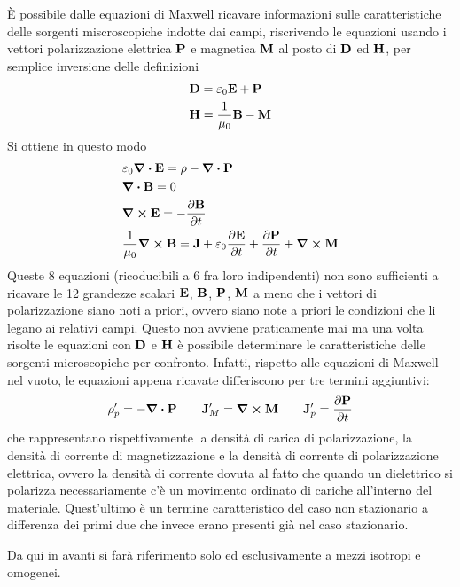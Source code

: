 È possibile dalle equazioni di Maxwell ricavare informazioni sulle caratteristiche delle sorgenti miscroscopiche
indotte dai campi, riscrivendo le equazioni usando i vettori polarizzazione elettrica $\vb{P}$ e magnetica $\vb{M}$
al posto di $\vb{D}$ ed $\vb{H}$, per semplice inversione delle definizioni
\[
    \begin{split}
        & \vb{D}=\varepsilon_0 \vb{E} + \vb{P} \\
        & \vb{H}=\frac{1}{\mu_0}\vb{B} - \vb{M} \\
    \end{split}
\]
Si ottiene in questo modo
\[
    \begin{split}
        & \varepsilon_0\div{\vb{E}}=\rho-\div{\vb{P}}\\
        & \div{\vb{B}}=0 \\
        & \curl{\vb{E}}=-\pdv{\vb{B}}{t}\\
        & \frac{1}{\mu_0}\curl{\vb{B}}=\vb{J}+\varepsilon_0\pdv{\vb{E}}{t}+\pdv{\vb{P}}{t}+\curl{\vb{M}}
    \end{split}
\]
Queste 8 equazioni (ricoducibili a 6 fra loro indipendenti) non sono sufficienti a ricavare le
12 grandezze scalari $\vb{E}$, $\vb{B}$, $\vb{P}$, $\vb{M}$ a meno che i vettori di polarizzazione
siano noti a priori, ovvero siano note a priori le condizioni che li legano ai relativi
campi. Questo non avviene praticamente mai ma una volta risolte le equazioni con $\vb{D}$ e $\vb{H}$ è possibile
determinare le caratteristiche delle sorgenti microscopiche per confronto.
Infatti, rispetto alle equazioni di Maxwell nel vuoto, le equazioni appena ricavate differiscono per tre termini aggiuntivi:
\[
    \rho'_p=-\div{\vb{P}} \quad\quad \vb{J}'_M=\curl{\vb{M}} \quad\quad \vb{J}'_p=\pdv{\vb{P}}{t}
\]
che rappresentano rispettivamente la densità di carica di polarizzazione, la densità di corrente di
magnetizzazione e la densità di corrente di polarizzazione elettrica, ovvero la densità di corrente dovuta al fatto che quando
un dielettrico si polarizza necessariamente c'è un movimento ordinato di cariche all'interno del materiale. Quest'ultimo
è un termine caratteristico del caso non stazionario a differenza dei primi due che invece erano presenti già nel caso stazionario.

Da qui in avanti si farà riferimento solo ed esclusivamente a mezzi isotropi e omogenei.

